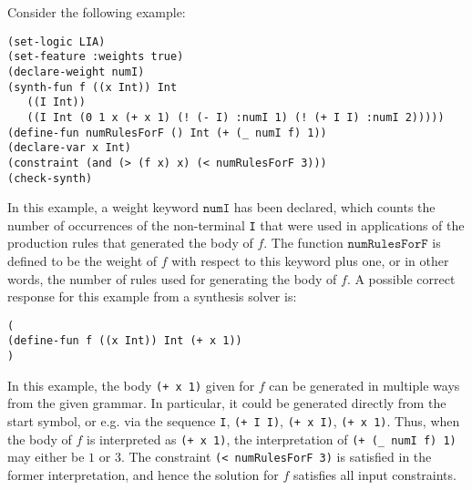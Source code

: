 \documentclass[english,a4paper,10pt]{article}
\begin{document}
\begin{example}
Consider the following example:
\begin{lstlisting}[language=SyGuS]
(set-logic LIA)
(set-feature :weights true)
(declare-weight numI)
(synth-fun f ((x Int)) Int
   ((I Int))
   ((I Int (0 1 x (+ x 1) (! (- I) :numI 1) (! (+ I I) :numI 2)))))
(define-fun numRulesForF () Int (+ (_ numI f) 1))
(declare-var x Int)
(constraint (and (> (f x) x) (< numRulesForF 3)))
(check-synth)
\end{lstlisting}
In this example, a weight keyword $\texttt{numI}$ has been declared,
which counts the number of occurrences of the non-terminal \texttt{I} that
were used in applications of the production rules that generated the body of $f$.
The function $\texttt{numRulesForF}$ is defined to be the weight of $f$ with
respect to this keyword plus one, or in other words, the number of
rules used for generating the body of $f$.
A possible correct response for this example from a synthesis solver is:
\begin{lstlisting}[language=SyGuS]
(
(define-fun f ((x Int)) Int (+ x 1))
)
\end{lstlisting}
In this example,
the body \texttt{(+ x 1)} given for $f$ can be generated in multiple ways from the given grammar.
In particular, it could be generated directly from the start symbol,
or e.g. via the sequence \texttt{I}, \texttt{(+ I I)}, \texttt{(+ x I)}, \texttt{(+ x 1)}.
Thus, when the body of $f$ is interpreted as \texttt{(+ x 1)},
the interpretation of \texttt{(+ (\_ numI f) 1)} may either be $1$ or $3$.
The constraint \texttt{(< numRulesForF 3)} is satisfied in the former interpretation,
and hence the solution for $f$ satisfies all input constraints.
\end{example}
\end{document}
